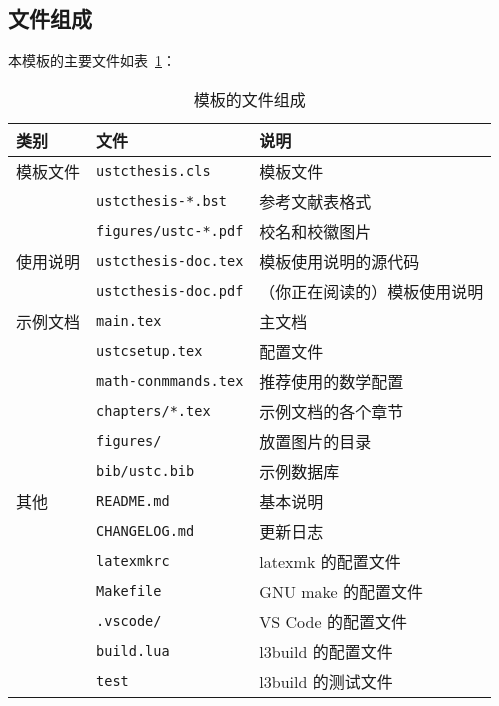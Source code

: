 \documentclass[a4paper]{ltxdoc}
\DeclareRobustCommand\file{\nolinkurl}
\begin{document}
\subsection{文件组成}
本模板的主要文件如表~\ref{tab:files}：
\begin{table}[htb]
  \centering\small
  \caption{模板的文件组成}
  \label{tab:files}
  \begin{tabular}{lll}
    \toprule
    类别     & 文件                      & 说明                         \\
    \midrule
    模板文件 & \file{ustcthesis.cls}     & 模板文件                     \\
             & \file{ustcthesis-*.bst}   & 参考文献表格式               \\
             & \file{figures/ustc-*.pdf} & 校名和校徽图片               \\
    \midrule
    使用说明 & \file{ustcthesis-doc.tex} & 模板使用说明的源代码         \\
             & \file{ustcthesis-doc.pdf} & （你正在阅读的）模板使用说明 \\
    \midrule
    示例文档 & \file{main.tex}           & 主文档                       \\
             & \file{ustcsetup.tex}      & 配置文件                     \\
             & \file{math-conmmands.tex} & 推荐使用的数学配置           \\
             & \file{chapters/*.tex}     & 示例文档的各个章节           \\
             & \file{figures/}           & 放置图片的目录               \\
             & \file{bib/ustc.bib}       & \BibTeX{} 示例数据库         \\
    \midrule
    其他     & \file{README.md}          & 基本说明                     \\
             & \file{CHANGELOG.md}       & 更新日志                     \\
             & \file{latexmkrc}          & latexmk 的配置文件           \\
             & \file{Makefile}           & GNU make 的配置文件          \\
             & \file{.vscode/}           & VS Code 的配置文件           \\
             & \file{build.lua}          & l3build 的配置文件           \\
             & \file{test}               & l3build 的测试文件           \\
    \bottomrule
  \end{tabular}
\end{table}
\end{document}
